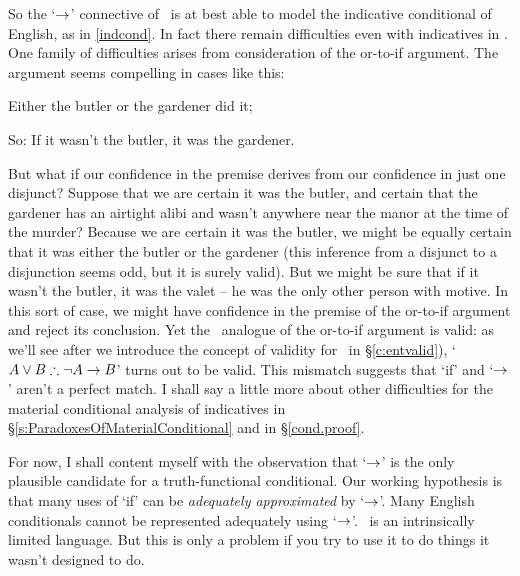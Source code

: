So the `$\rightarrow$' connective of \TFL\ is at best able to model the indicative conditional of English, as in \ref{indcond}. In fact there remain difficulties even with indicatives in \TFL. One family of difficulties arises from consideration of the or-to-if argument. The argument seems compelling in cases like this:
\begin{earg}
	\item Either the butler or the gardener did it;
	\item[So:] If it wasn't the butler, it was the gardener.
\end{earg} But what if our confidence in the premise derives from our confidence in just one disjunct? Suppose that we are certain it was the butler, and certain that the gardener has an airtight alibi and wasn't anywhere near the manor at the time of the murder? Because we are certain it was the butler, we might be equally certain that it was either the butler or the gardener (this inference from a disjunct to a disjunction seems odd, but it is surely valid). But we might be sure that if it wasn't the butler, it was the valet – he was the only other person with motive. In this sort of case, we might have confidence in the premise of the or-to-if argument and reject its conclusion. Yet the \TFL\ analogue of the or-to-if argument is valid: as we'll see after we introduce the concept of validity for \TFL\ in §\ref{c:entvalid}), `$A \vee B \mathrel{\therefore} \neg A \rightarrow B$' turns out to be valid. This mismatch suggests that `if' and `$\rightarrow$' aren't a perfect match. I shall say a little more about other difficulties for the material conditional analysis of indicatives in §\ref{s:ParadoxesOfMaterialConditional} and in §\ref{cond.proof}.

For now, I shall content myself with the observation that `$\rightarrow$' is the only plausible candidate for a truth-functional conditional. Our working hypothesis is that many uses of ‘if’ can be \emph{adequately approximated} by ‘$\rightarrow$’. Many English conditionals cannot be represented adequately using `$\rightarrow$'. \TFL\ is an intrinsically limited language. But this is only a problem if you try to use it to do things it wasn't designed to do. 


